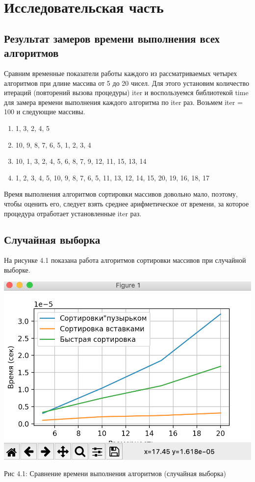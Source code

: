 \documentclass[12pt]{report}
\begin{document}
\chapter{Исследовательская часть}

\section{Результат замеров времени выполнения всех алгоритмов} 

Сравним временные показатели работы каждого из рассматриваемых четырех алгоритмов при длине массива от 5 до 20 чисел. Для этого установим количество итераций (повторений вызова процедуры) iter и воспользуемся библиотекой time для замера времени выполнения каждого алгоритма по iter раз. Возьмем iter = 100 и следующие массивы.
\begin{enumerate}
\item 1, 3, 2, 4, 5
\item 10, 9, 8, 7, 6, 5, 1, 2, 3, 4
\item 10, 1, 3, 2, 4, 5, 6, 8, 7, 9, 12, 11, 15, 13, 14
\item  1, 2, 3, 4, 5, 10, 9, 8, 7, 6, 5, 11, 13, 12, 14, 15, 20, 19, 16, 18, 17
\end{enumerate}

Время выполнения алгоритмов сортировки массивов довольно мало, поэтому, чтобы оценить его, следует взять среднее арифметическое от времени, за которое процедура отработает установленные iter раз. 

\section{Случайная выборка}

На рисунке 4.1 показана работа алгоритмов сортировки массивов при случайной выборке.

\begin{center}
		\includegraphics[scale=0.6]{pics/Time.png}
		
			Рис 4.1: Сравнение времени выполнения алгоритмов (случайная выборка)
\end{center}
\end{document}
